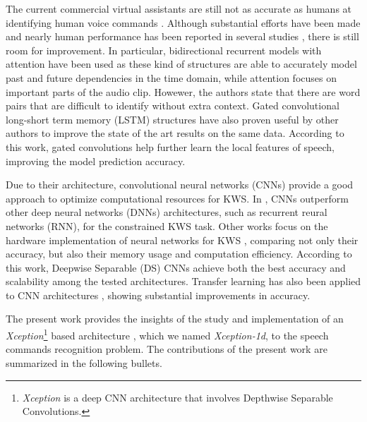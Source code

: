 The current commercial virtual assistants are still not as accurate as humans at identifying human voice commands \cite{Michaely2017}. Although substantial efforts have been made and nearly human performance has been reported in several studies \cite{Andrade2018, Zhang2017, McMahan2018, Warden2018}, there is still room for improvement. In particular, bidirectional recurrent models with attention have been used  \cite{Andrade2018} as these kind of structures are able to accurately model past and future dependencies in the time domain, while attention focuses on important parts of the audio clip. Howewer, the authors state that there are word pairs that are difficult to identify without extra context. Gated convolutional long-short term memory (LSTM) structures have also proven useful by other authors \cite{Wang2018} to improve the state of the art results on the same data. According to this work, gated convolutions help further learn the local features of speech, improving the model prediction accuracy.

Due to their architecture, convolutional neural networks (CNNs) provide a good approach to optimize computational resources for KWS. In \cite{Tara2015}, CNNs outperform other deep neural networks (DNNs) architectures, such as recurrent reural networks (RNN), for the constrained KWS task. Other works focus on the hardware implementation of neural networks for KWS \cite{Zhang2017}, comparing not only their accuracy, but also their memory usage and computation efficiency. According to this work, Deepwise Separable (DS) CNNs achieve both the best accuracy and scalability among the tested architectures.  Transfer learning has also been applied to CNN architectures \cite{McMahan2018}, showing substantial improvements in accuracy.

The present work provides the insights of the study and implementation of an \textit{Xception}\footnote{\textit{Xception} is a deep CNN architecture that involves Depthwise Separable Convolutions.} based architecture \cite{FChollet2017}, which we named \textit{Xception-1d}, to the speech commands recognition problem.  The contributions of the present work are summarized in the following bullets.


